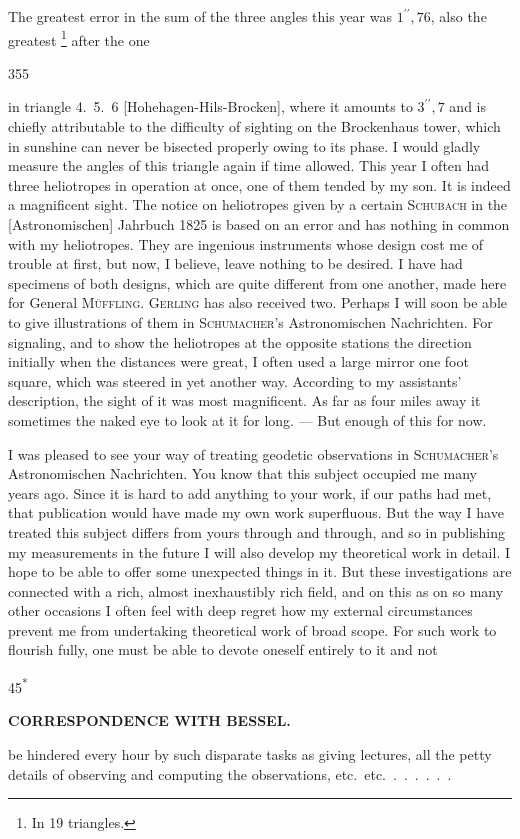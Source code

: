 The greatest error in the sum of the three angles this year was \(1^{\prime\prime}{,}76\), also the greatest \footnote{In 19 triangles.} after the one
\par\clearpage
{}\hfill355\par\medskip
\noindent in triangle 4.~5.~6 [Hohehagen-Hils-Brocken], where it amounts to \(3^{\prime\prime}{,}7\) and is chiefly attributable to the difficulty of sighting on the Brockenhaus tower, which in sunshine can never be bisected properly owing to its phase.
I would gladly measure the angles of this triangle again if time allowed.
This year I often had three heliotropes in operation at once, one of them tended by my son. It is indeed a magnificent sight.
The notice on heliotropes given by a certain \textsc{Schubach} in the [Astronomischen] Jahrbuch 1825 is based on an error and has nothing in common with my heliotropes. They are ingenious instruments whose design cost me  of trouble at first, but now, I believe, leave nothing to be desired.
I have had specimens of both designs, which are quite different from one another, made here for General \textsc{Müffling}. \textsc{Gerling} has also received two. Perhaps I will soon be able to give illustrations of them in \textsc{Schumacher}'s Astronomischen Nachrichten.
For signaling, and to show the heliotropes at the opposite stations the direction initially when the distances were great, I often used a large mirror one foot square, which was steered in yet another way.
According to my assistants' description, the sight of it was most magnificent. As far as four miles away it sometimes  the naked eye to look at it for long. --- But enough of this for now.

\par\noindent\hspace*{\parindent}I was pleased to see your way of treating geodetic observations in \textsc{Schumacher}'s Astronomischen Nachrichten.
You know that this subject occupied me many years ago.
Since it is hard to add anything to your work, if our paths had met, that publication would have made my own work superfluous.
But the way I have treated this subject differs from yours through and through, and so in publishing my measurements in the future I will also develop my theoretical work in detail.
I hope to be able to offer some unexpected things in it.
But these investigations are connected with a rich, almost inexhaustibly rich field, and on this as on so many other occasions I often feel with deep regret how my external circumstances prevent me from undertaking theoretical work of broad scope.
For such work to flourish fully, one must be able to devote oneself entirely to it and not
\par\smallskip\noindent\hfill{\footnotesize45\textsuperscript{*}}\par
\clearpage
{}\hfill{\small\textbf{CORRESPONDENCE WITH BESSEL.}}\par\medskip
\noindent be hindered every hour by such disparate tasks as giving lectures, all the petty details of observing and computing the observations, etc.\ etc.\ .\ .\ .\ .\ .\ .

